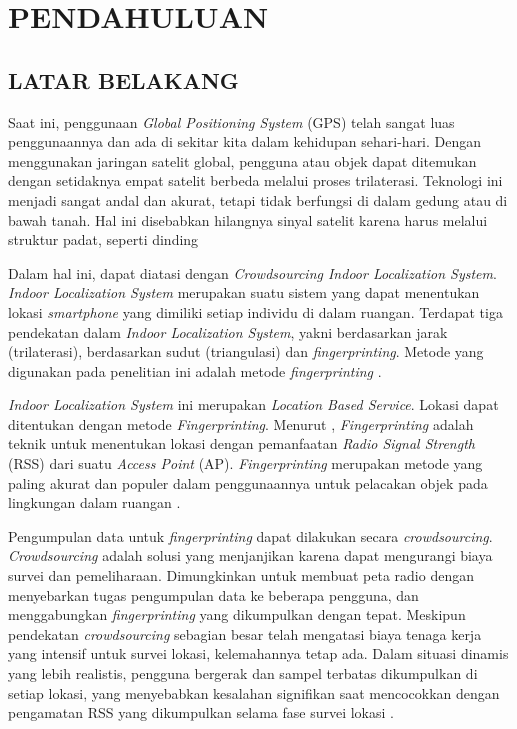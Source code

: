 \fancyhf{}
\fancyfoot[C]{\thepage}


\chapter{PENDAHULUAN}

\section{\uppercase{LATAR BELAKANG}}


\par Saat ini, penggunaan \textit{Global Positioning System} (GPS) telah sangat luas penggunaannya dan ada di sekitar kita dalam kehidupan sehari-hari. Dengan menggunakan jaringan satelit global, pengguna atau objek dapat ditemukan dengan setidaknya empat satelit berbeda melalui proses trilaterasi. Teknologi ini menjadi sangat andal dan akurat, tetapi tidak berfungsi di dalam gedung atau di bawah tanah. Hal ini disebabkan hilangnya sinyal satelit karena harus melalui struktur padat, seperti dinding \citep{Santos2021}

\par Dalam hal ini, dapat diatasi dengan \textit{Crowdsourcing Indoor Localization System}. \textit{Indoor Localization System} merupakan suatu sistem yang dapat menentukan lokasi \textit{smartphone} yang dimiliki setiap individu di dalam ruangan. Terdapat tiga pendekatan dalam \textit{Indoor Localization System}, yakni berdasarkan jarak (trilaterasi), berdasarkan sudut (triangulasi) dan \textit{fingerprinting}. Metode yang digunakan pada penelitian ini adalah metode \textit{fingerprinting} \citep{Santos2021}.

\par \textit{Indoor Localization System} ini merupakan \textit{Location Based Service}. Lokasi dapat ditentukan dengan metode \textit{Fingerprinting}. Menurut \citep{Muhammad2018}, \textit{Fingerprinting} adalah teknik untuk menentukan lokasi dengan pemanfaatan \textit{Radio Signal Strength} (RSS) dari suatu \textit{Access Point} (AP). \textit{Fingerprinting} merupakan metode yang paling akurat dan populer dalam penggunaannya untuk pelacakan objek pada lingkungan dalam ruangan \citep{Yim2010}.

\par Pengumpulan data untuk \textit{fingerprinting} dapat dilakukan secara \textit{crowdsourcing}. \textit{Crowdsourcing} adalah solusi yang menjanjikan karena dapat mengurangi biaya survei dan pemeliharaan. Dimungkinkan untuk membuat peta radio dengan menyebarkan tugas pengumpulan data ke beberapa pengguna, dan menggabungkan \textit{fingerprinting} yang dikumpulkan dengan tepat. Meskipun pendekatan \textit{crowdsourcing} sebagian besar telah mengatasi biaya tenaga kerja yang intensif untuk survei lokasi, kelemahannya tetap ada.  Dalam situasi dinamis yang lebih realistis, pengguna bergerak dan sampel terbatas dikumpulkan di setiap lokasi, yang menyebabkan kesalahan signifikan saat mencocokkan dengan pengamatan RSS yang dikumpulkan selama fase survei lokasi \citep{Sun2019}.

